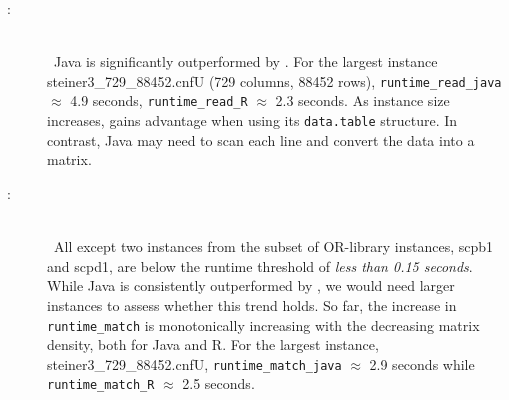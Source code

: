 \begin{description}

\item[:]~\\\
 Java is significantly outperformed by \R{}.
 For the largest instance steiner3\_729\_88452.cnfU (729 columns, 88452 rows),
 {\tt runtime\_read\_java} $\approx$ 4.9 seconds, 
 {\tt runtime\_read\_R}    $\approx$ 2.3 seconds.
As instance size increases,
 \R{} gains  advantage when using its {\tt data.table} structure.
 In contrast, Java may need to scan each line and convert the data into a matrix.
 

\item[:]~\\\
 All except two instances from
 the subset of OR-library instances, scpb1 and scpd1,
 are below the runtime threshold of {\it less than 0.15 seconds}.
 While Java is consistently outperformed by \R{},
 we would need larger instances to assess whether this trend holds.
 So far, the increase in {\tt runtime\_match} is monotonically increasing
 with the decreasing matrix density, both for Java and R.
 For the largest instance, steiner3\_729\_88452.cnfU,  %
 {\tt runtime\_match\_java} $\approx$ 2.9 seconds while 
 {\tt runtime\_match\_R}    $\approx$ 2.5 seconds.

%

%
 


\end{description}
